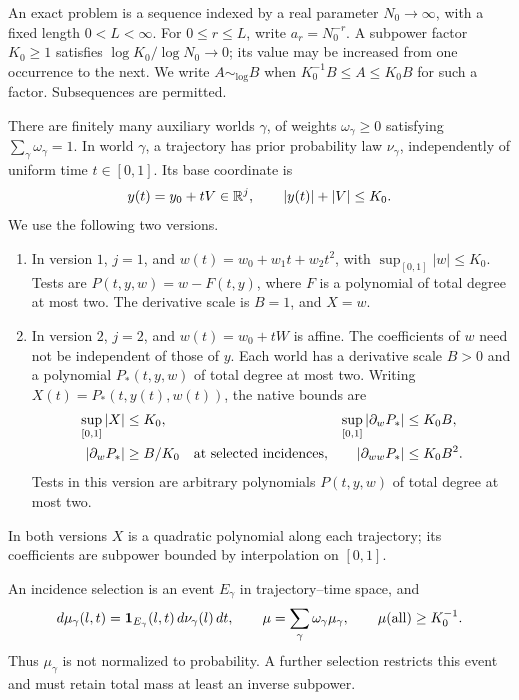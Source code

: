 \begin{definition}\label{def:exact-problem}
An exact problem is a sequence indexed by a real parameter
\(N_0\to\infty\), with a fixed length \(0<L<\infty\).
For \(0\le r\le L\), write \(a_r=N_0^{-r}\).
A subpower factor \(K_0\ge1\) satisfies
\(\log K_0/\log N_0\to0\); its value may be increased from one occurrence
to the next.  We write \(A\sim_{\log}B\) when
\(K_0^{-1}B\le A\le K_0B\) for such a factor.
Subsequences are permitted.

There are finitely many auxiliary worlds \(\gamma\), of weights
\(\omega_\gamma\ge0\) satisfying \(\sum_\gamma\omega_\gamma=1\).
In world \(\gamma\), a trajectory has prior probability law
\(\nu_\gamma\), independently of uniform time \(t\in[0,1]\).
Its base coordinate is
\[
 y(t)=y_0+tV\in\mathbb R^j,\qquad |y(t)|+|V|\le K_0.
\]
We use the following two versions.
\begin{enumerate}
\item In version \(1\), \(j=1\), and
\(w(t)=w_0+w_1t+w_2t^2\), with
\(\sup_{[0,1]}|w|\le K_0\).
Tests are \(P(t,y,w)=w-F(t,y)\), where \(F\) is a polynomial of
total degree at most two.  The derivative scale is \(B=1\), and \(X=w\).
\item In version \(2\), \(j=2\), and \(w(t)=w_0+tW\) is affine.
The coefficients of \(w\) need not be independent of those of \(y\).
Each world has a derivative scale \(B>0\) and a polynomial
\(P_*(t,y,w)\) of total degree at most two.  Writing
\(X(t)=P_*(t,y(t),w(t))\), the native bounds are
\begin{align}
 \sup_{[0,1]}|X|&\le K_0,&
 \sup_{[0,1]}|\partial_wP_*|&\le K_0B,
 \label{a01:native-bounds}\\
 |\partial_wP_*|&\ge B/K_0
       \quad\hbox{at selected incidences},&
 |\partial_{ww}P_*|&\le K_0B^2.
 \notag
\end{align}
Tests in this version are arbitrary polynomials \(P(t,y,w)\) of
total degree at most two.
\end{enumerate}
In both versions \(X\) is a quadratic polynomial along each trajectory;
its coefficients are subpower bounded by interpolation on \([0,1]\).

An incidence selection is an event \(E_\gamma\) in trajectory--time
space, and
\begin{equation}
 d\mu_\gamma(l,t)=\mathbf 1_{E_\gamma}(l,t)\,d\nu_\gamma(l)\,dt,
 \qquad
 \mu=\sum_\gamma\omega_\gamma\mu_\gamma,\qquad
 \mu(\mathrm{all})\ge K_0^{-1}.
 \label{a01:incidence-law}
\end{equation}
Thus \(\mu_\gamma\) is not normalized to probability.
A further selection restricts this event and must retain total mass
at least an inverse subpower.
\end{definition}

